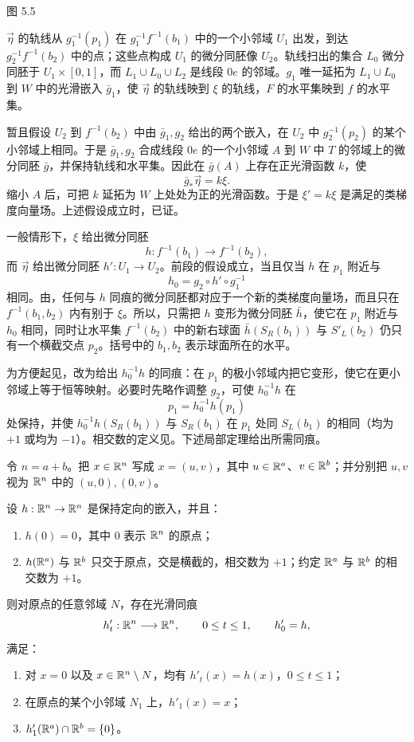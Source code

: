 \begin{center}
  \FigFiveFive

  \label{fig:5.5}图 5.5
\end{center}

$\vec\eta$ 的轨线从 $g_1^{-1}(p_1)$ 在 $g_1^{-1}f^{-1}(b_1)$ 中的一个小邻域 $U_1$ 出发，到达 $g_2^{-1}f^{-1}(b_2)$ 中的点；这些点构成 $U_1$ 的微分同胚像 $U_2$。轨线扫出的集合 $L_0$ 微分同胚于 $U_1\times[0,1]$，而 $L_1\cup L_0\cup L_2$ 是线段 $0e$ 的邻域。$g_1$ 唯一延拓为 $L_1\cup L_0$ 到 $W$ 中的光滑嵌入 $\bar g_1$，使 $\vec\eta$ 的轨线映到 $\xi$ 的轨线，$F$ 的水平集映到 $f$ 的水平集。

暂且假设 $U_2$ 到 $f^{-1}(b_2)$ 中由 $\bar g_1,g_2$ 给出的两个嵌入，在 $U_2$ 中 $g_2^{-1}(p_2)$ 的某个小邻域上相同。于是 $\bar g_1,g_2$ 合成线段 $0e$ 的一个小邻域 $A$ 到 $W$ 中 $T$ 的邻域上的微分同胚 $\bar g$，并保持轨线和水平集。因此在 $\bar g(A)$ 上存在正光滑函数 $k$，使
\[
  \bar g_*\vec\eta=k\xi.
\]
缩小 $A$ 后，可把 $k$ 延拓为 $W$ 上处处为正的光滑函数。于是 $\xi'=k\xi$ 是满足的类梯度向量场。上述假设成立时，已证。

一般情形下，$\xi$ 给出微分同胚
\[
  h:f^{-1}(b_1)\longrightarrow f^{-1}(b_2),
\]
而 $\vec\eta$ 给出微分同胚 $h':U_1\to U_2$。前段的假设成立，当且仅当 $h$ 在 $p_1$ 附近与
\[
  h_0=g_2\circ h'\circ g_1^{-1}
\]
相同。由，任何与 $h$ 同痕的微分同胚都对应于一个新的类梯度向量场，而且只在 $f^{-1}(b_1,b_2)$ 内有别于 $\xi$。所以，只需把 $h$ 变形为微分同胚 $\bar h$，使它在 $p_1$ 附近与 $h_0$ 相同，同时让水平集 $f^{-1}(b_2)$ 中的新右球面
$\bar h(S_R(b_1))$ 与 $S'_L(b_2)$ 仍只有一个横截交点 $p_2$。括号中的 $b_1,b_2$ 表示球面所在的水平。

为方便起见，改为给出 $h_0^{-1}h$ 的同痕：在 $p_1$ 的极小邻域内把它变形，使它在更小邻域上等于恒等映射。必要时先略作调整 $g_2$，可使 $h_0^{-1}h$ 在
\[
  p_1=h_0^{-1}h(p_1)
\]
处保持，并使 $h_0^{-1}h(S_R(b_1))$ 与 $S_R(b_1)$ 在 $p_1$ 处同 $S_L(b_1)$ 的相同（均为 $+1$ 或均为 $-1$）。相交数的定义见。下述局部定理给出所需同痕。

令 $n=a+b$。把 $x\in\mathbb{R}^n$ 写成 $x=(u,v)$，其中 $u\in\mathbb{R}^a$、$v\in\mathbb{R}^b$；并分别把 $u,v$ 视为 $\mathbb{R}^n$ 中的 $(u,0),(0,v)$。

设 $h:\mathbb{R}^n\to\mathbb{R}^n$ 是保持定向的嵌入，并且：
\begin{enumerate}[label=\arabic*)]
  \item $h(0)=0$，其中 $0$ 表示 $\mathbb{R}^n$ 的原点；
  \item $h(\mathbb{R}^a)$ 与 $\mathbb{R}^b$ 只交于原点，交是横截的，相交数为 $+1$；约定 $\mathbb{R}^a$ 与 $\mathbb{R}^b$ 的相交数为 $+1$。
\end{enumerate}
则对原点的任意邻域 $N$，存在光滑同痕
\[
  h'_t:\mathbb{R}^n\longrightarrow\mathbb{R}^n,
  \qquad 0\leq t\leq1,
  \qquad h'_0=h,
\]
满足：
\begin{enumerate}[label=(\Roman*)]
  \item 对 $x=0$ 以及 $x\in\mathbb{R}^n\setminus N$，均有
  $h'_t(x)=h(x)$，$0\leq t\leq1$；
  \item 在原点的某个小邻域 $N_1$ 上，$h'_1(x)=x$；
  \item $h'_1(\mathbb{R}^a)\cap\mathbb{R}^b=\{0\}$。
\end{enumerate}

